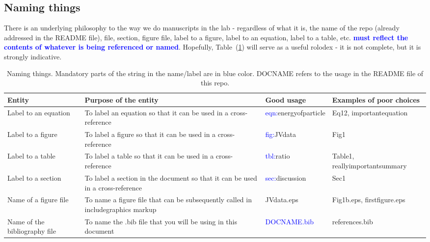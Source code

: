\documentclass[12 pt]{article}
\begin{document}
\subsection{Naming things}

There is an underlying philosophy to the way we do manuscripts in the lab - regardless of what it is, the name of the repo (already addressed in the README file), file, section, figure file, label to a figure, label to an equation, label to a table, etc. \textbf{\Huge \textcolor{blue}{must reflect the contents of whatever is being referenced or named}}. Hopefully, Table~(\ref{tbl:namingthings}) will serve as a useful rolodex - it is not complete, but it is strongly indicative.

\begin{center}
  \begin{longtable}{|p{3cm}|p{5cm}|p{3.5cm}|p{2.5cm}|}
    \caption{Naming things. Mandatory parts of the string in the name/label are in blue color. DOCNAME refers to the usage in the README file of this repo.} \label{tbl:namingthings}\\
    \hline
    \textbf{Entity}  & \textbf{Purpose of the entity} &  \textbf{Good usage} & \textbf{Examples of poor choices} \\\hline
    Label to an equation & To label an equation so that it can be used in a cross-reference & \textcolor{blue}{eqn:}energyofparticle & Eq12, importantequation \\\hline
    Label to a figure & To label a figure so that it can be used in a cross-reference & \textcolor{blue}{fig:}JVdata & Fig1 \\\hline
    Label to a table & To label a table so that it can be used in a cross-reference & \textcolor{blue}{tbl:}ratio & Table1, reallyimportantsummary \\\hline
    Label to a section & To label a section in the document so that it can be used in a cross-reference & \textcolor{blue}{sec:}discussion & Sec1 \\\hline
    Name of a figure file & To name a figure file that can be subsequently called in includegraphics markup & JVdata.eps & Fig1b.eps, firstfigure.eps\\\hline
    Name of the bibliography file & To name the .bib file that you will be using in this document & \textcolor{blue}{DOCNAME.bib} & references.bib \\\hline
  \end{longtable}
\end{center}
\end{document}
